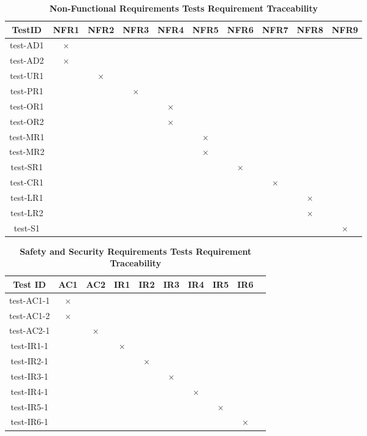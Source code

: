 \documentclass[12pt, titlepage]{article}
\begin{document}
\begin{table} [H]
  \centering
  \begin{tabular}{|c|c|c|c|c|c|c|c|c|c|}
    \hline
    TestID & NFR1 & NFR2 & NFR3 & NFR4 & NFR5 & NFR6 & NFR7 & NFR8 & NFR9 \\
    \hline
    test-AD1 & $\times$ & & & & & & & & \\
    \hline
    test-AD2 &  $\times$ & & & & & & & & \\
    \hline
    test-UR1 & & $\times$ &  & & & & & & \\
    \hline
    test-PR1 & & & $\times$ & & & & & & \\
    \hline
    test-OR1 & & & & $\times$ & & & & &  \\
    \hline
    test-OR2 & & & & $\times$ & & & & & \\
    \hline
    test-MR1 & & & & & $\times$ & & & &\\
    \hline
    test-MR2 & & & & & $\times$ & & & &  \\
    \hline
    test-SR1 & & & & & & $\times$ & & &\\
    \hline
    test-CR1 & & & & & & & $\times$ & &\\
    \hline
    test-LR1 & & & & & & & & $\times$ &\\
    \hline
    test-LR2 & & & & & & & & $\times$ & \\
    \hline
    test-S1 & & & & & & & & & $\times$ \\
    \hline
  \end{tabular}
\caption{\bf Non-Functional Requirements Tests Requirement Traceability} \label{tab:nfr-test-traceability}
\end{table}

\begin{table} [H]
  \centering
  \begin{tabular}{|c|c|c|c|c|c|c|c|c|c|}
  \hline
  Test ID & AC1 & AC2 & IR1 & IR2 & IR3 & IR4 & IR5 & IR6 \\
  \hline
  test-AC1-1 & $\times$ & & & & & & &   \\
  \hline
  test-AC1-2 & $\times$ & & & & & & &   \\
  \hline
  test-AC2-1 & & $\times$ & & & & & &   \\
  \hline
  test-IR1-1 & & & $\times$ & & & & &   \\
  \hline
  test-IR2-1  & & & & $\times$ & & & &  \\
  \hline
  test-IR3-1  & & & & & $\times$ & & &  \\
  \hline
  test-IR4-1  & & & & & & $\times$ & &  \\
  \hline
  test-IR5-1  & & & & & & &  $\times$ & \\
  \hline
  test-IR6-1  & & & & & & & &  $\times$ \\
  \hline
\end{tabular}
\caption{\bf Safety and Security Requirements Tests Requirement Traceability} \label{tab:sns-test-traceability}
\end{table}
\end{document}
